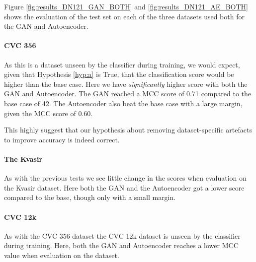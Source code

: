 %
Figure \ref{fig:results_DN121_GAN_BOTH} and \ref{fig:results_DN121_AE_BOTH} shows the evaluation of the test set on each of the three datasets used both for the GAN and Autoencoder. 

\paragraph{CVC 356}

As this is a dataset unseen by the classifier during training, we would expect, given that Hypothesis \ref{hyp:a} is True, that the classification score would be higher than the base case.
Here we have \textit{significantly} higher score with both the GAN and Autoencoder. 
The GAN reached a MCC score of 0.71 compared to the base case of 42. The Autoencoder also beat the base case with a large margin, given the MCC score of 0.60.

This highly suggest that our hypothesis about removing dataset-specific artefacts to improve accuracy is indeed correct. 

\paragraph{The Kvasir}
As with the previous tests we see little change in the scores when evaluation on the Kvasir dataset.
Here both the GAN and the Autoencoder got a lower score compared to the base, though only with a small margin.

\paragraph{CVC 12k}
As with the CVC 356 dataset the CVC 12k dataset is unseen by the classifier during training. 
Here, both the GAN and Autoencoder reaches a lower MCC value when evaluation on the dataset. 

































